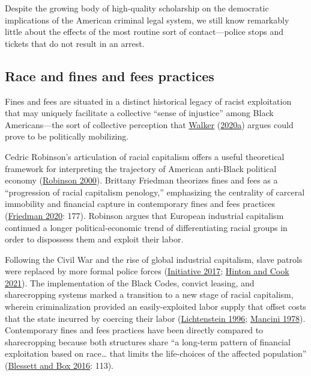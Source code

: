 \documentclass[
  12pt,
]{article}
\begin{document}
Despite the growing body of high-quality scholarship on the democratic implications of the American criminal legal system, we still know remarkably little about the effects of the most routine sort of contact---police stops and tickets that do not result in an arrest.

\hypertarget{race-and-fines-and-fees-practices}{%
\subsection*{Race and fines and fees practices}\label{race-and-fines-and-fees-practices}}

Fines and fees are situated in a distinct historical legacy of racist exploitation that may uniquely facilitate a collective ``sense of injustice'' among Black Americans---the sort of collective perception that \protect\hyperlink{ref-Walker2020a}{Walker} (\protect\hyperlink{ref-Walker2020a}{2020a}) argues could prove to be politically mobilizing.

Cedric Robinson's articulation of racial capitalism offers a useful theoretical framework for interpreting the trajectory of American anti-Black political economy (\protect\hyperlink{ref-Robinson2000}{Robinson 2000}). Brittany Friedman theorizes fines and fees as a ``progression of racial capitalism penology,'' emphasizing the centrality of carceral immobility and financial capture in contemporary fines and fees practices (\protect\hyperlink{ref-Friedman2020}{Friedman 2020}: 177). Robinson argues that European industrial capitalism continued a longer political-economic trend of differentiating racial groups in order to dispossess them and exploit their labor.

Following the Civil War and the rise of global industrial capitalism, slave patrols were replaced by more formal police forces (\protect\hyperlink{ref-EqualJusticeInitiative2017}{Initiative 2017}; \protect\hyperlink{ref-Hinton2021}{Hinton and Cook 2021}). The implementation of the Black Codes, convict leasing, and sharecropping systems marked a transition to a new stage of racial capitalism, wherein criminalization provided an easily-exploited labor supply that offset costs that the state incurred by coercing their labor (\protect\hyperlink{ref-Lichtenstein1996}{Lichtenstein 1996}; \protect\hyperlink{ref-Mancini1978}{Mancini 1978}). Contemporary fines and fees practices have been directly compared to sharecropping because both structures share ``a long-term pattern of financial exploitation based on race\ldots{} that limits the life-choices of the affected population'' (\protect\hyperlink{ref-Blessett2016}{Blessett and Box 2016}: 113).
\end{document}

